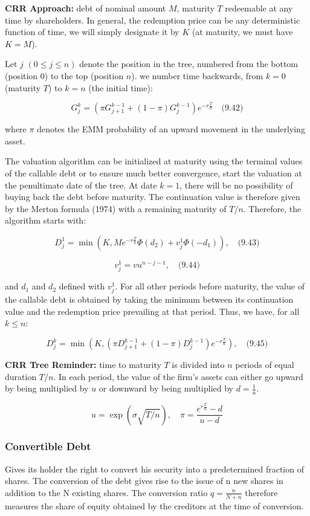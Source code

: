 \documentclass[12pt,a4paper]{article}
\begin{document}
\textbf{CRR Approach:} debt of nominal amount $M$, maturity $T$ redeemable at any time by shareholders. In general, the redemption price can be any deterministic function of time, we will simply designate it by $K$ (at maturity, we must have $K = M$).

Let $j$ $(0 \leq j \leq n)$ denote the position in the tree, numbered from the bottom (position 0) to the top (position $n$). we number time backwards, from $k = 0$ (maturity $T$) to $k = n$ (the initial time):

$$G_j^k = (\pi G_{j+1}^{k-1} + (1 - \pi)G_j^{k-1})e^{-r\frac{T}{n}} \quad \text{(9.42)}$$

where $\pi$ denotes the EMM probability of an upward movement in the underlying asset.

The valuation algorithm can be initialized at maturity using the terminal values of the callable debt or to ensure much better convergence, start the valuation at the penultimate date of the tree. At date $k = 1$, there will be no possibility of buying back the debt before maturity. The continuation value is therefore given by the Merton formula (1974) with a remaining maturity of $T/n$. Therefore, the algorithm starts with:

$$D_j^1 = \min\left(K, Me^{-r\frac{T}{n}}\Phi(d_2) + v_j^1\Phi(-d_1)\right), \quad \text{(9.43)}$$

$$v_j^1 = vu^{n-j-1}, \quad \text{(9.44)}$$

and $d_1$ and $d_2$ defined with $v_j^1$. For all other periods before maturity, the value of the callable debt is obtained by taking the minimum between its continuation value and the redemption price prevailing at that period. Thus, we have, for all $k \leq n$:

$$D_j^k = \min\left(K, (\pi D_{j+1}^{k-1} + (1-\pi)D_j^{k-1})e^{-r\frac{T}{n}}\right), \quad \text{(9.45)}$$

\textbf{CRR Tree Reminder:} time to maturity $T$ is divided into $n$ periods of equal duration $T/n$. In each period, the value of the firm's assets can either go upward by being multiplied by $u$ or downward by being multiplied by $d = \frac{1}{u}$. 

$$u = \exp(\sigma\sqrt{T/n}), \quad \pi = \frac{e^{r\frac{T}{n}} - d}{u - d} $$


\subsubsection{Convertible Debt }
Gives its holder the right to convert his security into a predetermined fraction of shares.
 The conversion of the debt gives 
rise to the issue of n new shares in addition to the N existing shares. The conversion ratio $q=\frac{n}{N+n}$ therefore measures the share of equity obtained by the creditors at the time of 
conversion. 
\end{document}
